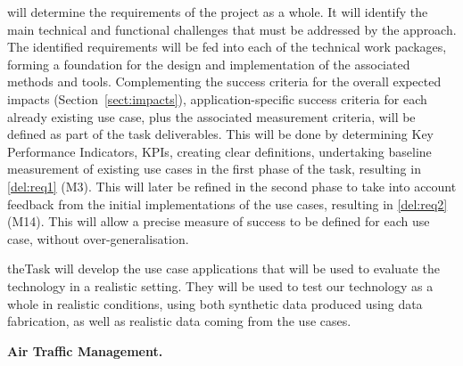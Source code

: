 \begin{Workpackage}{\thewpno}
\begin{Task}

\TaskResults{%
}
\TaskHeader{}
\theTask{} will determine the requirements of the \TheProject{} project as a whole.  It will identify the main technical and functional challenges that must be addressed by the \TheProject{} approach. The identified  requirements will be fed into each of the technical work packages, forming a foundation for the design and implementation of the associated methods and tools. Complementing the success criteria for the overall expected impacts (Section~\ref{sect:impacts}), application-specific success criteria for each already existing use case, plus the associated measurement criteria, will be defined as part of the task deliverables. This will be done by determining Key Performance Indicators, KPIs, creating clear definitions, undertaking baseline measurement of existing use cases in the first phase of the task, resulting in \ref{del:req1} (M3). This will later be refined in the second phase to take into account feedback from the initial implementations of the use cases, resulting in \ref{del:req2} (M14). This will allow a precise measure of success to be defined for each use case, without over-generalisation.
\end{Task}

\begin{Task}
\TaskResults{%
}
\TaskHeader{}
theTask{} will develop the use case applications that will be used to evaluate the \TheProject{} technology in a realistic setting. They will be used to test our technology as a whole in realistic conditions, using both synthetic data produced using data fabrication, as well as realistic data coming from the use cases.

\textbf{Air Traffic Management.} 


\end{Task}
\end{Workpackage}
